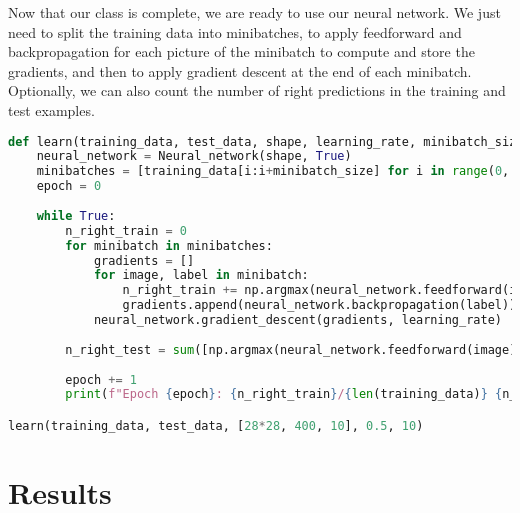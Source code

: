 \documentclass{article}
\theoremstyle{definition}
\theoremstyle{remark}
\theoremstyle{example}
\begin{document}
Now that our class is complete, we are ready to use our neural network. We just need to split the training data into minibatches, to apply feedforward and backpropagation for each picture of the minibatch to compute and store the gradients, and then to apply gradient descent at the end of each minibatch. Optionally, we can also count the number of right predictions in the training and test examples.
\begin{lstlisting}[language=Python]
def learn(training_data, test_data, shape, learning_rate, minibatch_size):
	neural_network = Neural_network(shape, True)
	minibatches = [training_data[i:i+minibatch_size] for i in range(0, len(training_data), minibatch_size)]
	epoch = 0
	
	while True:
		n_right_train = 0
		for minibatch in minibatches:
			gradients = []
			for image, label in minibatch:
				n_right_train += np.argmax(neural_network.feedforward(image))==np.argmax(label)
				gradients.append(neural_network.backpropagation(label))
			neural_network.gradient_descent(gradients, learning_rate)
		
		n_right_test = sum([np.argmax(neural_network.feedforward(image))==np.argmax(label) for image, label in test_data])
		
		epoch += 1
		print(f"Epoch {epoch}: {n_right_train}/{len(training_data)} {n_right_test}/{len(test_data)}")

learn(training_data, test_data, [28*28, 400, 10], 0.5, 10)
\end{lstlisting}

\newpage
\section{Results}
\end{document}
